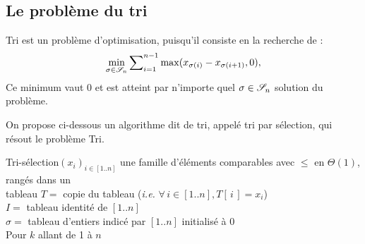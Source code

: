 	\subsection{Le problème du tri}
		
		\begin{center}
		\end{center}
		
		\begin{Remarque}
			\textsf{{Tri}} est un problème d'optimisation, puisqu'il consiste en la recherche de :
			\[
				\min_{\sigma\in\mathscr{S}_n} \sum\nolimits_{i=1}^{n-1} \max (x_{\sigma(i)} - x_{\sigma(i+1)}, 0) ,
			\]
			Ce minimum vaut 0 et est atteint par n'importe quel \( \sigma \in \mathscr{S}_n \) solution du problème.
		\end{Remarque}
		
		On propose ci-dessous un algorithme dit de tri, appelé tri par sélection, qui résout le problème \textsf{Tri}.
		
		\begin{algo}{Tri-sélection}{\( \left( x_i \right)_{i \in [1..n]} \) une famille d'éléments comparables avec \( \leq \) en \( \Theta (1) \), rangés dans un \\ \entspace tableau}{}{}
			\( T =\) copie du tableau (\emph{i.e.} \( \forall \, i \in [1..n], T[\, i \,] = x_i \)) \\
			\( I = \) tableau identité de \( [1..n] \) \\
			\( \sigma = \) tableau d'entiers indicé par \( [1..n] \) initialisé à 0 \\
			Pour $k$ allant de 1 à $n$ \\ \Indp
				 \\[1mm]
		\end{algo}
	
